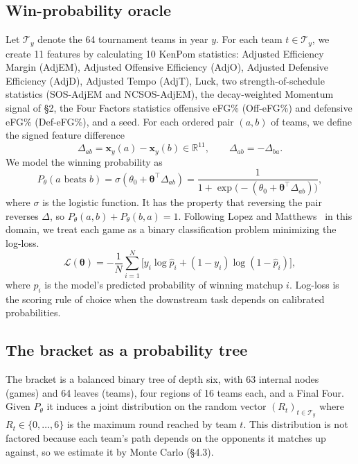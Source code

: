 \documentclass[12pt]{article}
\begin{document}
\subsection{Win-probability oracle}

Let $\mathcal{T}_y$ denote the 64 tournament teams in year $y$. For each team $t\in\mathcal{T}_y$, we create 11 features by calculating 10 KenPom statistics: Adjusted Efficiency Margin (AdjEM), Adjusted Offensive Efficiency (AdjO), Adjusted Defensive Efficiency (AdjD), Adjusted Tempo (AdjT), Luck, two strength-of-schedule statistics (SOS-AdjEM and NCSOS-AdjEM), the decay-weighted Momentum signal of \S2, the Four Factors statistics offensive eFG\% (Off-eFG\%) and defensive eFG\% (Def-eFG\%), and a seed. For each ordered pair $(a, b)$ of teams, we define the signed feature difference
\begin{equation}
\Delta_{ab} = \mathbf{x}_y(a) - \mathbf{x}_y(b) \in \mathbb{R}^{11}, \qquad \Delta_{ab} = -\Delta_{ba}.
\end{equation}
We model the winning probability as
\begin{equation}
P_\theta(a\text{ beats }b) = \sigma\!\left(\theta_0 + \boldsymbol{\theta}^{\!\top} \Delta_{ab}\right) = \frac{1}{1 + \exp\!\big(-(\theta_0 + \boldsymbol{\theta}^{\!\top} \Delta_{ab})\big)},
\end{equation}
where $\sigma$ is the logistic function. It has the property that reversing the pair reverses $\Delta$, so $P_\theta(a, b) + P_\theta(b, a) = 1$. Following Lopez and Matthews~\cite{lopezmatthews} in this domain, we treat each game as a binary classification problem minimizing the log-loss.
\begin{equation}
\mathcal{L}(\boldsymbol{\theta}) = -\frac{1}{N}\sum_{i=1}^N \big[y_i \log \hat{p}_i + (1-y_i)\log(1-\hat{p}_i)\big],
\end{equation}
where $\hat p_i$ is the model's predicted probability of winning matchup $i$. Log-loss is the scoring rule of choice when the downstream task depends on calibrated probabilities.

\subsection{The bracket as a probability tree}

The bracket is a balanced binary tree of depth six, with 63 internal nodes (games) and 64 leaves (teams), four regions of 16 teams each, and a Final Four. Given $P_\theta$ it induces a joint distribution on the random vector $(R_t)_{t \in \mathcal{T}_y}$ where $R_t \in \{0,\dots,6\}$ is the maximum round reached by team $t$. This distribution is not factored because each team's path depends on the opponents it matches up against, so we estimate it by Monte Carlo (\S4.3).
\end{document}
